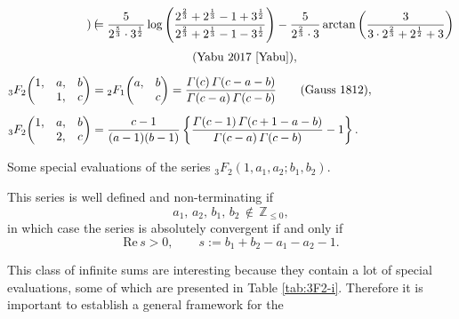 \documentclass[a4paper,12pt]{article}
\theoremstyle{plain}
\def\rRe{\mathrm{Re}}
\def\Z{\mathbb{Z}}
\def\vG{\varGamma}
\begin{document}
\begin{table}[t]
\begin{align*}
\begin{pmatrix}
\end{pmatrix} 
&= \frac{5}{ 2^{\frac{5}{3}} \cdot 3^{\frac{1}{2}} } \log \left( 
\frac{ 2^{\frac{2}{3}} + 2^{\frac{1}{3}} -1 + 3^{\frac{1}{2}} }{ 2^{\frac{2}{3}} + 2^{\frac{1}{3}} -1 - 3^{\frac{1}{2}} } \right) 
- \frac{5}{ 2^{\frac{2}{3}} \cdot 3 } \arctan \left( \frac{3}{3 \cdot 2^{\frac{2}{3}} + 2^{\frac{1}{2}} + 3} \right) \\[1mm]
& \hspace{3cm} \mbox{(Yabu 2017 \cite{Yabu})}, \\[2mm]
{}_3F_2\! 
\begin{pmatrix} 
1, & a, & b \\ 
   & 1, & c    
\end{pmatrix} &= {}_2F_1\! 
\begin{pmatrix} 
a, & b \\ 
   & c    
\end{pmatrix} = \dfrac{\vG( c ) \, \vG( c-a-b ) }{\vG( c-a ) \, \vG( c-b )} 
\qquad \mbox{(Gauss 1812)}, \\[2mm]
{}_3F_2\! 
\begin{pmatrix} 
1, & a, & b \\ 
   & 2, & c    
\end{pmatrix} &= \dfrac{c-1}{(a-1)(b-1)} 
\left\{ \dfrac{\vG( c-1 ) \, \vG( c+1-a-b ) }{\vG( c-a ) \, \vG( c-b )} - 1\right\}.      
\end{align*}
\caption{Some special evaluations of the series ${}_3F_2(1, a_1, a_2; b_1, b_2)$.} 
\label{tab:3F2-i}
\end{table} 
This series is well defined and non-terminating if   
\begin{equation} \label{eqn:wd-i} 
a_1, \, a_2, \, b_1, \, b_2 \, \not\in \, \Z_{\le 0},      
\end{equation}
in which case the series is absolutely convergent if and only if 
\begin{equation} \label{eqn:saal-i}
\rRe \, s > 0, \qquad s := b_1+b_2-a_1-a_2-1.  
\end{equation}
\par
This class of infinite sums are interesting because they contain a lot of 
special evaluations, some of which are presented in Table \ref{tab:3F2-i}.  
Therefore it is important to establish a general framework for the 
\end{document}
